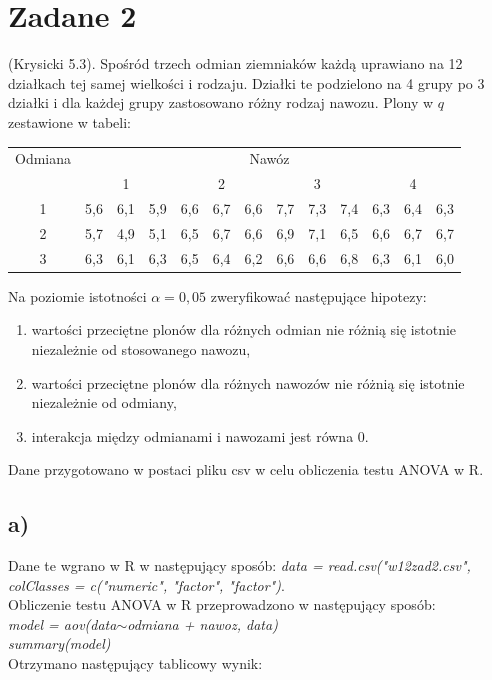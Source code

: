 \documentclass{article}
\begin{document}
\newpage
\section{Zadane 2}
(Krysicki 5.3). Spośród trzech odmian ziemniaków każdą uprawiano na 12 działkach tej samej wielkości i rodzaju. Działki te podzielono na 4 grupy po 3 działki i dla każdej grupy zastosowano różny rodzaj nawozu. Plony w $q$ zestawione w tabeli:
\begin{center} \begin{tabular}{|c|ccc|ccc|ccc|ccc|} \hline
Odmiana & \multicolumn{12}{|c|}{Nawóz} \\ \cline{2-13}
& \multicolumn{3}{|c|}{1} & \multicolumn{3}{|c|}{2} & \multicolumn{3}{|c|}{3} & \multicolumn{3}{|c|}{4} \\ \hline
1 & 5,6 & 6,1 & 5,9 & 6,6 & 6,7 & 6,6 & 7,7 & 7,3 & 7,4 & 6,3 & 6,4 & 6,3 \\ 
2 & 5,7 & 4,9 & 5,1 & 6,5 & 6,7 & 6,6 & 6,9 & 7,1 & 6,5 & 6,6 & 6,7 & 6,7 \\ 
3 & 6,3 & 6,1 & 6,3 & 6,5 & 6,4 & 6,2 & 6,6 & 6,6 & 6,8 & 6,3 & 6,1 & 6,0 \\ \hline
\end{tabular} \end{center}

Na poziomie istotności $\alpha=0,05$ zweryfikować następujące hipotezy:
\begin{enumerate}[label = \alph*)]
\item wartości przeciętne plonów dla różnych odmian nie różnią się istotnie niezależnie od stosowanego nawozu,
\item wartości przeciętne plonów dla różnych nawozów nie różnią się istotnie niezależnie od odmiany,
\item interakcja między odmianami i nawozami jest równa 0.
\end{enumerate}

Dane przygotowano w postaci pliku csv w celu obliczenia testu ANOVA w R.
\begin{center}
\scriptsize
{}
\end{center}

\subsection{a)}
Dane te wgrano w R w następujący sposób: \textit{data = read.csv("w12zad2.csv", colClasses = c("numeric", "factor", "factor")}. \\
Obliczenie testu ANOVA w R przeprowadzono w następujący sposób: \\
\textit{model = aov(data$\sim$odmiana + nawoz, data)} \\
\textit{summary(model)} \\
Otrzymano następujący tablicowy wynik:
\end{document}
